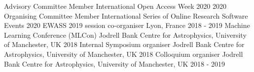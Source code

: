 \begin{cvpress}
    \cvpres
   {Advisory Committee Member}
    {International Open Access Week 2020}
    {2020}
    \cvpres
   {Organising Committee Member}
    {International Series of Online Research Software Events}
    {2020}
   \cvpres
   {EWASS 2019 session co-organiser}
    {Lyon, France}
    {2018 - 2019}
   \cvpres
   {Machine Learning Conference (MLCon)}
    {Jodrell Bank Centre for Astrophysics, University of Manchester, UK}
    {2018}
   \cvpres
   {Internal Symposium organiser}
    {Jodrell Bank Centre for Astrophysics, University of Manchester, UK}
    {2018}
   \cvpres
   {Colloquium organiser}
    {Jodrell Bank Centre for Astrophysics, University of Manchester, UK}
    {2018 - 2019}
\end{cvpress}


